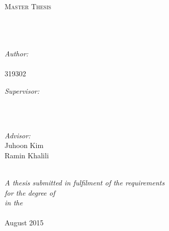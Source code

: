 \documentclass[10pt, oneside]{Thesis} %
\begin{document}
\begin{titlepage}
\begin{center}

\textsc{\LARGE \univname}\\[1.5cm] %
\textsc{\Large Master Thesis}\\[0.5cm] %

\HRule \\[0.4cm] %
{\huge \bfseries \ttitle}\\[0.4cm] %
\HRule \\[1.5cm] %
 
\begin{minipage}{0.4\textwidth}
\begin{flushleft} \large
\emph{Author:}\\
{\authornames}\\
{\small{319302}}
\end{flushleft}
\end{minipage}
\begin{minipage}{0.4\textwidth}
\begin{flushright} \large
\emph{Supervisor:} \\
{\supname}\\ %
\small{}
\end{flushright}
\end{minipage}\\[1cm]
\begin{minipage}{0.8\textwidth}
\begin{flushright} \large
\emph{Advisor:} \\
Juhoon Kim \\
Ramin Khalili
\end{flushright}
\end{minipage}\\[3cm]
 
\large \textit{A thesis submitted in fulfilment of the requirements\\ for the degree of \degreename}\\[0.3cm] %
\textit{in the}\\[0.4cm]
\deptname\\[2cm] %
 
{\large August 2015}\\[4cm]
 
\vfill
\end{center}

\end{titlepage}
\end{document}
